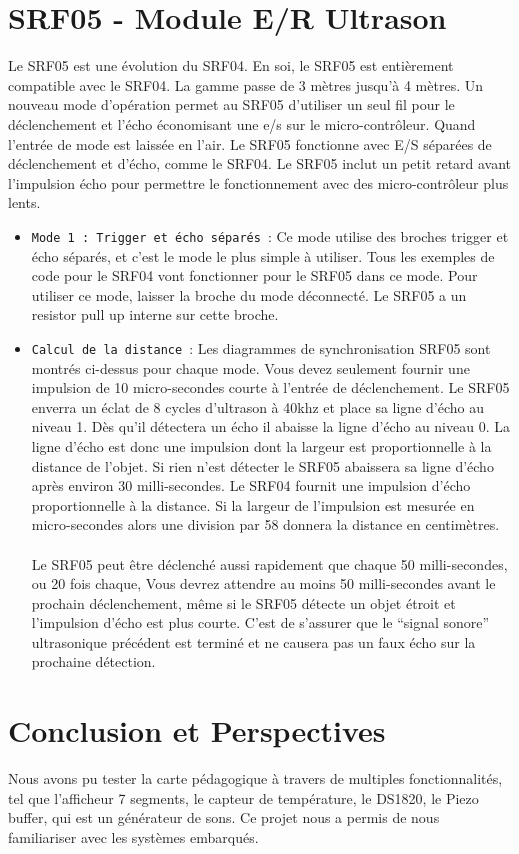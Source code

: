 \documentclass[a4paper, 12pt]{book}
\begin{document}
\chapter{SRF05 - Module E/R Ultrason}
Le SRF05 est une évolution du SRF04. En soi, le SRF05 est entièrement compatible avec le SRF04. La gamme passe de 3 mètres jusqu’à 4 mètres. Un nouveau mode d’opération permet au SRF05 d’utiliser un seul fil pour le déclenchement et l’écho économisant une e/s sur le micro-contrôleur. Quand l’entrée de mode est laissée en l’air. Le SRF05 fonctionne avec E/S séparées de déclenchement et d’écho, comme le SRF04. Le SRF05 inclut un petit retard avant l’impulsion écho pour permettre le fonctionnement avec des micro-contrôleur plus lents.\\
\begin{itemize}
\item \texttt{Mode 1 : Trigger et écho séparés}~:
Ce mode utilise des broches trigger et écho séparés, et c’est le mode le plus simple à utiliser. Tous les exemples de code pour le SRF04 vont fonctionner pour le SRF05 dans ce mode. Pour utiliser ce mode, laisser la broche du mode déconnecté. Le SRF05 a un resistor pull up interne sur cette broche.\\

\item \texttt{Calcul de la distance}~:
Les diagrammes de synchronisation SRF05 sont montrés ci-dessus pour chaque mode. Vous devez seulement fournir une impulsion de 10 micro-secondes courte à l’entrée de déclenchement. Le SRF05 enverra un éclat de 8 cycles d’ultrason à 40khz et place sa ligne d’écho au niveau 1. Dès qu’il détectera un écho il abaisse la ligne d’écho au niveau 0. La ligne d’écho est donc une impulsion dont la largeur est proportionnelle à la distance de l’objet. Si rien n’est détecter le SRF05 abaissera sa ligne d’écho après environ 30 milli-secondes. Le SRF04 fournit une impulsion d’écho proportionnelle à la distance. Si la largeur de l’impulsion est mesurée en micro-secondes alors une division par 58 donnera la distance en centimètres.\\\\

Le SRF05 peut être déclenché aussi rapidement que chaque 50 milli-secondes, ou 20 fois chaque, Vous devrez attendre au moins 50 milli-secondes avant le prochain déclenchement, même si le SRF05 détecte un objet étroit et l’impulsion d’écho est plus courte. C’est de s’assurer que le “signal sonore” ultrasonique précédent est terminé et ne causera pas un faux écho sur la prochaine détection.
\end{itemize}

\cite{redbook}

\chapter{Conclusion et Perspectives\label{chap-conclusion}}
Nous avons pu tester la carte pédagogique à travers de multiples fonctionnalités, tel que l'afficheur 7 segments, le capteur de température, le DS1820, le Piezo buffer, qui est un générateur de sons. 
Ce projet nous a permis de nous familiariser avec les systèmes embarqués.



\end{document}
